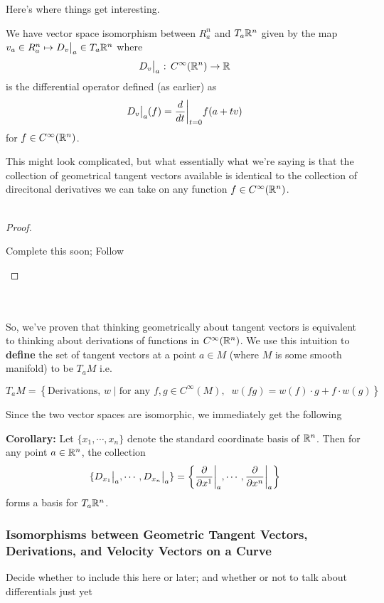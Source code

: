 \documentclass[11pt]{article}
\begin{document}
Here's where things get interesting.
\begin{bluebox}
  \begin{theorem}
    We have vector space isomorphism between $R^{n}_{a}$ and $T_a \mathbb{R}^n$ given by the map $v_a \in R^n_{a} \mapsto \restr{D_{v}}{a} \in T_{a} \R^n$ where 
    \[ \restr{D_{v}}{a} \text{ : } C^{\infty}(\R^n) \rightarrow \R  \]
    is the differential operator defined (as earlier) as 
    \[ \restr{D_{v}}{a} (f) = \restr{\frac{d}{dt}}{t = 0} f(a + tv) \]
    for $f \in C^{\infty}(\mathbb{R}^n)$.
  \end{theorem}
\end{bluebox}
This might look complicated, but what essentially what we're saying is that the collection of geometrical tangent vectors available is identical to the collection of direcitonal derivatives we can take on any function $f \in C^{\infty}(\mathbb{R}^n)$.
\\
\\
\begin{proof}
  \begin{note}
    {Complete this soon; Follow \cite[proposition 3.2]{LeeSM}}
  \end{note}
\end{proof}
\\
\\
So, we've proven that thinking geometrically about tangent vectors is equivalent to thinking about derivations of functions in $C^{\infty}(\mathbb{R}^n)$. We use this intuition to \textbf{define} the set of tangent vectors at a point $a \in M$ (where $M$ is some smooth manifold) to be $T_a M$ i.e. 
\begin{redbox}
  \[ T_a M = \left\{ \text{Derivations, } w \;\vert\; \text{for any } f,g \in C^{\infty}(M), \;\; w(fg) = w(f) \cdot g + f \cdot w(g) \right\}  \]
\end{redbox}
Since the two vector spaces are isomorphic, we immediately get the following
\begin{bluebox}
  \textbf{Corollary:} Let $\{x_1, \cdots, x_n\}$ denote the standard coordinate basis of $\mathbb{R}^n$. Then for any point $a \in \mathbb{R}^n$, the collection
  \[ \{ \restr{D_{x_1}}{a}, \cdots, \restr{D_{x_n}}{a} \} = \left\{ \restr{\frac{\partial}{\partial x^1}}{a}, \cdots, \restr{\frac{\partial}{\partial x^n}}{a} \right\} \]
  forms a basis for $T_a \mathbb{R}^n$.
\end{bluebox}

\subsubsection*{Isomorphisms between Geometric Tangent Vectors, Derivations, and Velocity Vectors on a Curve}
\begin{note}
  {Decide whether to include this here or later; and whether or not to talk about differentials just yet}
\end{note}
\end{document}
